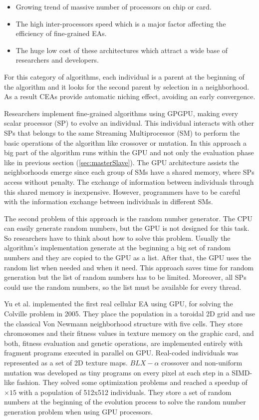 \documentclass[review]{elsarticle}
\begin{document}
\begin{itemize}
\item Growing trend of massive number of processors on chip or card. 
\item The high inter-processors speed which is a major factor affecting the efficiency of fine-grained EAs. 
\item The huge low cost of these architectures which attract a wide base of researchers and developers. 
\end{itemize}

For this category of algorithms, each individual is a parent at the beginning of the algorithm and it looks for the second parent by selection in a neighborhood. As a result CEAs provide automatic niching effect, avoiding an early convergence. 

Researchers implement fine-grained algorithms using GPGPU, making every scalar processor (SP) to evolve an individual. This individual interacts with other SPs that belongs to the same Streaming Multiprocessor (SM) to perform the basic operations of the algorithm like crossover or mutation. In this approach a big part of the algorithm runs within the GPU and not only the evaluation phase like in previous section (\ref{sec:masterSlave}). The GPU architecture assists the neighborhoods emerge since each group of SMs have a shared memory, where SPs access without penalty. The exchange of information between individuals through this shared memory is inexpensive. However, programmers have to be careful with the information exchange between individuals in different SMs. 

The second problem of this approach is the random number generator. The CPU can easily generate random numbers, but the GPU is not designed for this task. So researchers have to think about how to solve this problem. Usually the algorithm's implementation generate at the beginning a big set of random numbers and they are copied to the GPU as a list. After that, the GPU uses the random list when needed and when it need. This approach saves time for random generation but the list of random numbers has to be limited. Moreover, all SPs could use the random numbers, so the list must be available for every thread. 


Yu et al. \cite{yu-parallel-2005} implemented the first real cellular EA using GPU, for solving the Colville problem \cite{Ng:2005:DFF:1064290.1064296} in 2005. They place the population in a toroidal 2D grid and use the classical Von Newmann neighborhood structure with five cells. They store chromosomes and their fitness values in texture memory on the graphic card, and both, fitness evaluation and genetic operations, are implemented entirely with fragment programs executed in parallel on GPU. Real-coded individuals was represented as a set of 2D texture maps. $BLX-\alpha$ crossover and non-uniform mutation was developed as tiny programs on every pixel at each step in a SIMD-like fashion. They solved some optimization problems and reached a speedup of $\times15$ with a population of 512x512 individuals. They store a set of random numbers at the beginning of the evolution process to solve the random number generation problem when using GPU processors. 
\end{document}
